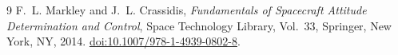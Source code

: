 %

\begin{thebibliography}{9}
F.~L. Markley and J.~L. Crassidis,
\emph{Fundamentals of Spacecraft Attitude Determination and Control},
Space Technology Library, Vol.~33, Springer, New York, NY, 2014.
\href{https://doi.org/10.1007/978-1-4939-0802-8}{doi:10.1007/978-1-4939-0802-8}.
\end{thebibliography}


